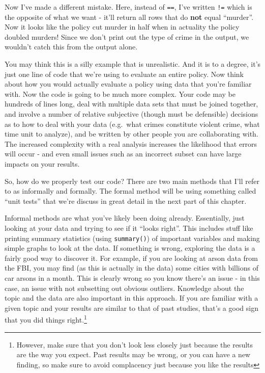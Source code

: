 \documentclass[
  12pt,
]{book}
\newenvironment{Shaded}{\begin{snugshade}}{\end{snugshade}}
\newcommand{\CommentTok}[1]{\textcolor[rgb]{0.37,0.37,0.37}{\textit{#1}}}
\newcommand{\FunctionTok}[1]{\textcolor[rgb]{0,0,0}{#1}}
\newcommand{\NormalTok}[1]{#1}
\newcommand{\SpecialCharTok}[1]{\textcolor[rgb]{0,0,0}{#1}}
\newcommand{\StringTok}[1]{\textcolor[rgb]{0.5,0.5,0.5}{#1}}
\begin{document}
Now I've made a different mistake. Here, instead of \texttt{==}, I've written \texttt{!=} which is the opposite of what we want - it'll return all rows that do \textbf{not} equal ``murder''. Now it looks like the policy cut murder in half when in actuality the policy doubled murders! Since we don't print out the type of crime in the output, we wouldn't catch this from the output alone.

\begin{Shaded}
\end{Shaded}

You may think this is a silly example that is unrealistic. And it is to a degree, it's just one line of code that we're using to evaluate an entire policy. Now think about how you would actually evaluate a policy using data that you're familiar with. Now the code is going to be much more complex. Your code may be hundreds of lines long, deal with multiple data sets that must be joined together, and involve a number of relative subjective (though must be defensible) decisions as to how to deal with your data (e.g.~what crimes constitute violent crime, what time unit to analyze), and be written by other people you are collaborating with. The increased complexity with a real analysis increases the likelihood that errors will occur - and even small issues such as an incorrect subset can have large impacts on your results.

So, how do we properly test our code? There are two main methods that I'll refer to as informally and formally. The formal method will be using something called ``unit tests'' that we're discuss in great detail in the next part of this chapter.

Informal methods are what you've likely been doing already. Essentially, just looking at your data and trying to see if it ``looks right''. This includes stuff like printing summary statistics (using \texttt{summary()}) of important variables and making simple graphs to look at the data. If something is wrong, exploring the data is a fairly good way to discover it. For example, if you are looking at arson data from the FBI, you may find (as this is actually in the data) some cities with billions of car arsons in a month. This is clearly wrong so you know there's an issue - in this case, an issue with not subsetting out obvious outliers. Knowledge about the topic and the data are also important in this approach. If you are familiar with a given topic and your results are similar to that of past studies, that's a good sign that you did things right.\footnote{However, make sure that you don't look less closely just because the results are the way you expect. Past results may be wrong, or you can have a new finding, so make sure to avoid complacency just because you like the results}
\end{document}
